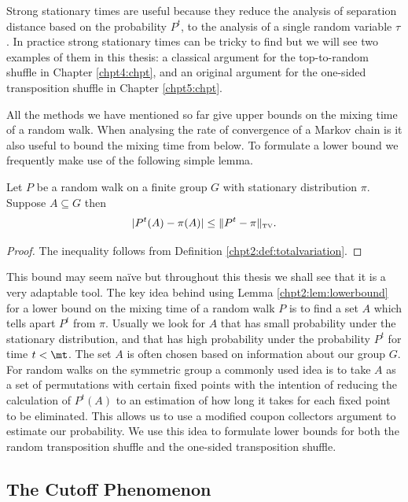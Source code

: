 \documentclass[11pt]{report}
\begin{document}
Strong stationary times are useful because they reduce the analysis of 
separation distance based on the probability $P^{t}$, to the analysis of a 
single random variable $\tau$. In practice 
strong stationary times can be tricky to find but we will see 
two examples of them in this thesis: a classical argument for the top-to-random shuffle in Chapter \ref{chpt4:chpt}, and an original argument for the one-sided transposition shuffle in Chapter \ref{chpt5:chpt}.

All the methods we have mentioned so far give upper bounds on the mixing time 
of a random walk. When analysing the rate of convergence of a Markov chain is 
it also useful to bound the mixing time from below. To formulate a lower bound we frequently make use of the following simple lemma.

\begin{lemma}
	\label{chpt2:lem:lowerbound}
	Let $P$ be a random walk on a finite group $G$ with stationary distribution $\pi$. 
	Suppose $A \subseteq G$ then
	\[|P^{t}(A) - \pi(A) | \leq \lVert P^{t} - \pi \rVert_{\textnormal{\tiny 
			TV}}.\]
\end{lemma}
\begin{proof}
	The inequality follows from Definition \ref{chpt2:def:totalvariation}.
\end{proof}

This bound may seem na\"{i}ve but throughout this thesis  we shall see that it is a very adaptable tool. The key idea behind using Lemma 
\ref{chpt2:lem:lowerbound} for a lower bound on the  mixing time of a random walk $P$ is to find a set $A$ 
which tells apart $P^{t}$ from $\pi$. Usually we look for $A$ that has small 
probability under the stationary distribution, and that has high probability 
under the probability $P^{t}$ for time $t< \mt$. The set 
$A$ is often chosen based on information about our group $G$. For random walks 
on the symmetric group a commonly used idea is to take $A$ as a set of permutations with certain fixed points with 
the intention of reducing the calculation of $P^{t}(A)$ to an estimation of how 
long it takes for each fixed point to be eliminated. This allows us to use a modified coupon collectors argument to estimate our probability. We use this idea to formulate lower bounds for both the random transposition shuffle and the one-sided transposition shuffle. 





\subsection{The Cutoff Phenomenon}
\end{document}
